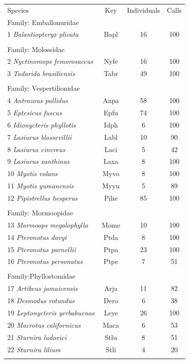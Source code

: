 \documentclass[wsdraft]{ws-rv9x6} %
\begin{document}
\begin{table}[ht]
	{\begin{tabular}{@{}lccc@{}} \toprule
			Species & Key & Individuals & Calls \\ \colrule
			Family: Emballonuridae &&& \\
			1 \textit{Balantiopteryx plicata} & Bapl & 16 & 100 \\
			\\
			Family: Molossidae &&& \\
			2 \textit{Nyctinomops femorosaccus} & Nyfe & 16 & 100 \\
			3 \textit{Tadarida brasiliensis} & Tabr & 49 & 100  \\
			\\
			Family: Vespertilionidae &&& \\
			4 \textit{Antrozous pallidus} & Anpa & 58 & 100 \\
			5 \textit{Eptesicus fuscus} & Epfu & 74 & 100 \\
			6 \textit{Idionycteris phyllotis} & Idph & 6 & 100 \\
			7 \textit{Lasiurus blossevillii} & Labl & 10 & 90 \\
			8 \textit{Lasiurus cinereus} & Laci & 5 & 42 \\
			9 \textit{Lasiurus xanthinus} & Laxa & 8 & 100 \\
			10 \textit{Myotis volans} & Myvo & 8 & 100 \\
			11 \textit{Myotis yumanensis} & Myyu & 5 & 89 \\
			12 \textit{Pipistrellus hesperus} & Pihe & 85 & 100 \\
			\\
			Family: Mormoopidae &&& \\
			13 \textit{Mormoops megalophylla} & Mome & 10 & 100 \\
			14 \textit{Pteronotus davyi} & Ptda & 8 & 100 \\
			15 \textit{Pteronotus parnellii} & Ptpa & 23 & 100 \\
			16 \textit{Pteronotus personatus} & Ptpe & 7 & 51 \\
			\\
			Family:Phyllostomidae &&& \\
			17 \textit{Artibeus jamaicensis} & Arja & 11 & 82 \\
			18 \textit{Desmodus rotundus} & Dero & 6 & 38 \\
			19 \textit{Leptonycteris yerbabuenae} & Leye & 26 & 100 \\
			20 \textit{Macrotus californicus} & Maca & 6 & 53 \\
			21 \textit{Sturnira ludovici} & Stlu & 8 & 51 \\
			22 \textit{Sturnira lilium} & Stli & 4 & 20 \\
			\botrule
		\end{tabular}
	}
	\label{tab::dataset}
\end{table}
\end{document}
